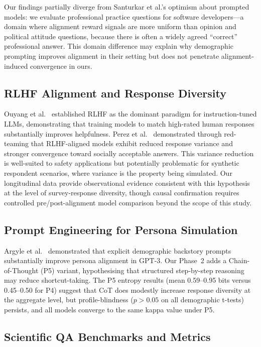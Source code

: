 \documentclass[12pt,a4paper]{article}
\begin{document}
Our findings partially diverge from Santurkar et al.'s optimism about
prompted models: we evaluate professional practice questions for software
developers---a domain where alignment reward signals are more uniform
than opinion and political attitude questions, because there is often a
widely agreed ``correct'' professional answer.
This domain difference may explain why demographic prompting improves
alignment in their setting but does not penetrate alignment-induced
convergence in ours.

\subsection{RLHF Alignment and Response Diversity}
\label{sec:rw:rlhf}

Ouyang et al.~\cite{ouyang2022} established RLHF as the dominant
paradigm for instruction-tuned LLMs, demonstrating that training models
to match high-rated human responses substantially improves helpfulness.
Perez et al.~\cite{perez2022} demonstrated through red-teaming that
RLHF-aligned models exhibit reduced response variance and stronger
convergence toward socially acceptable answers.
This variance reduction is well-suited to safety applications but
potentially problematic for synthetic respondent scenarios, where
variance is the property being simulated.
Our longitudinal data provide observational evidence consistent with
this hypothesis at the level of survey-response diversity,
though causal confirmation requires controlled pre/post-alignment
model comparison beyond the scope of this study.

\subsection{Prompt Engineering for Persona Simulation}
\label{sec:rw:prompt}

Argyle et al.~\cite{argyle2023} demonstrated that explicit demographic
backstory prompts substantially improve persona alignment in GPT-3.
Our Phase~2 adds a Chain-of-Thought (P5) variant, hypothesising that
structured step-by-step reasoning may reduce shortcut-taking.
The P5 entropy results (mean 0.59--0.95 bits versus 0.45--0.50 for P4)
suggest that CoT does modestly increase response diversity at the
aggregate level, but profile-blindness ($p > 0.05$ on all demographic
t-tests) persists, and all models converge to the same kappa value
under P5.

\subsection{Scientific QA Benchmarks and Metrics}
\label{sec:rw:metrics}
\end{document}
